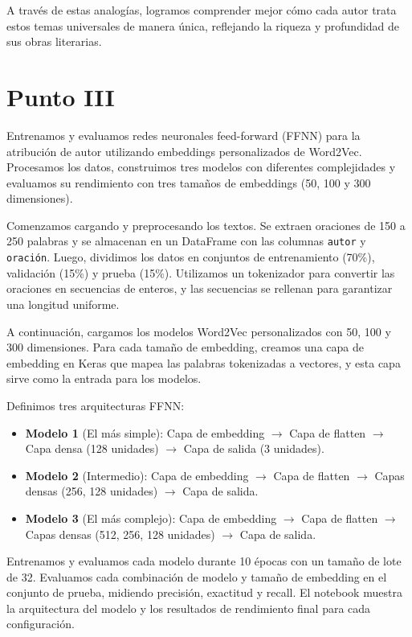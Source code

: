 \documentclass[11pt,english]{article}
\theoremstyle{plain}
\begin{document}
A través de estas analogías, logramos comprender mejor cómo cada autor trata estos temas universales de manera única, reflejando la riqueza y profundidad de sus obras literarias.

\section*{Punto III}

Entrenamos y evaluamos redes neuronales feed-forward (FFNN) para la atribución de autor utilizando embeddings personalizados de Word2Vec. Procesamos los datos, construimos tres modelos con diferentes complejidades y evaluamos su rendimiento con tres tamaños de embeddings (50, 100 y 300 dimensiones).

Comenzamos cargando y preprocesando los textos. Se extraen oraciones de 150 a 250 palabras y se almacenan en un DataFrame con las columnas \texttt{autor} y \texttt{oración}. Luego, dividimos los datos en conjuntos de entrenamiento (70\%), validación (15\%) y prueba (15\%). Utilizamos un tokenizador para convertir las oraciones en secuencias de enteros, y las secuencias se rellenan para garantizar una longitud uniforme.

A continuación, cargamos los modelos Word2Vec personalizados con 50, 100 y 300 dimensiones. Para cada tamaño de embedding, creamos una capa de embedding en Keras que mapea las palabras tokenizadas a vectores, y esta capa sirve como la entrada para los modelos.

Definimos tres arquitecturas FFNN:
\begin{itemize}
    \item \textbf{Modelo 1} (El más simple): Capa de embedding $\rightarrow$ Capa de flatten $\rightarrow$ Capa densa (128 unidades) $\rightarrow$ Capa de salida (3 unidades).
    \item \textbf{Modelo 2} (Intermedio): Capa de embedding $\rightarrow$ Capa de flatten $\rightarrow$ Capas densas (256, 128 unidades) $\rightarrow$ Capa de salida.
    \item \textbf{Modelo 3} (El más complejo): Capa de embedding $\rightarrow$ Capa de flatten $\rightarrow$ Capas densas (512, 256, 128 unidades) $\rightarrow$ Capa de salida.
\end{itemize}

Entrenamos y evaluamos cada modelo durante 10 épocas con un tamaño de lote de 32. Evaluamos cada combinación de modelo y tamaño de embedding en el conjunto de prueba, midiendo precisión, exactitud y recall. El notebook muestra la arquitectura del modelo y los resultados de rendimiento final para cada configuración.
\end{document}
